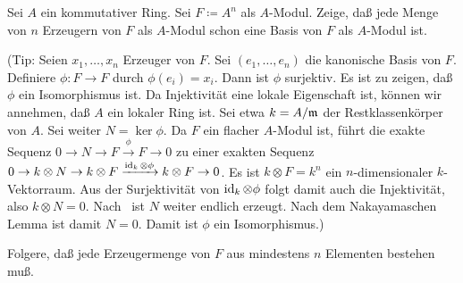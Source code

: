 \begin{exercise}
	Sei \(A\) ein kommutativer Ring. Sei \(F \coloneqq A^n\) als \(A\)-Modul. Zeige, daß jede Menge von \(n\) Erzeugern von
	\(F\) als \(A\)-Modul schon eine Basis von \(F\) als \(A\)-Modul ist.
	
	(Tip: Seien \(x_1, \dotsc, x_n\) Erzeuger von \(F\). Sei \((e_1, \dotsc, e_n)\) die kanonische Basis von \(F\). Definiere
	\(\phi\colon F \to F\) durch \(\phi(e_i) = x_i\). Dann ist \(\phi\) surjektiv. Es ist zu zeigen, daß \(\phi\) ein Isomorphismus
	ist. Da Injektivität eine lokale Eigenschaft ist, können wir annehmen, daß \(A\) ein lokaler Ring ist. Sei etwa \(k = A/\mathfrak{m}\)
	der Restklassenkörper von \(A\). Sei weiter \(N = \ker \phi\). Da \(F\) ein flacher \(A\)-Modul ist, führt die exakte
	Sequenz \(0 \to N \to F \xrightarrow{\phi} F \to 0\) zu einer exakten Sequenz \(0 \to k \otimes N \to k \otimes F \xrightarrow
	{\operatorname{id}_k \otimes \phi} k \otimes F \to 0\). Es ist \(k \otimes F = k^n\) ein \(n\)-dimensionaler \(k\)-Vektorraum. Aus der Surjektivität von
	\(\operatorname{id}_k \otimes \phi\) folgt damit auch die Injektivität, also \(k \otimes N = 0\).
	Nach~ ist \(N\) weiter endlich erzeugt. Nach dem Nakayamaschen Lemma ist damit \(N = 0\). Damit 
	ist \(\phi\) ein Isomorphismus.)
	
	Folgere, daß jede Erzeugermenge von \(F\) aus mindestens \(n\) Elementen bestehen muß.
\end{exercise}

